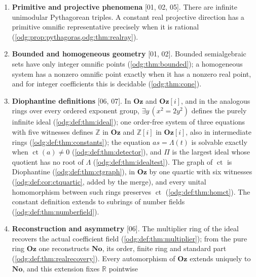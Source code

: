 \documentclass[11pt,oneside]{article}
\numberwithin{equation}{section}
\theoremstyle{definition}
\theoremstyle{remark}
\newcommand{\No}{\mathbf{No}}
\newcommand{\Oz}{\mathbf{Oz}}
\newcommand{\Z}{\mathbb Z}
\newcommand{\R}{\mathbb R}
\newcommand{\ct}{\operatorname{ct}}
\newcommand{\src}[1]{\textup{\textsf{\small[#1]}}}
\newcommand{\Og}{\Oz[i]}
\begin{document}
\begin{enumerate}[label=\textup{(\arabic*)},leftmargin=*,itemsep=3pt]
\[
 (U^2-2V^2-1)^2+
 \Bigl(U-\sum_{i=1}^{n}X_i^2-W_1^2-W_2^2-W_3^2\Bigr)^2=0
\]
with five existentially quantified auxiliary variables defines exactly
$\Z^n$ inside $\Oz^n$ (\cref{odg:thm:guard}); a variant with six auxiliary
variables and four squares defines $\Z$ (\cref{odg:thm:standarddef}), and
source 07 found the same variant independently. The graph of $\ct$ and the
ideal $\Pi$ are first-order definable (\cref{odg:cor:definablect}) and, by
item (8), Diophantine; an explicit existential induction instance fails
(\cref{odg:thm:induction}).
\item \textbf{Primitive and projective phenomena} \src{01, 02, 05}. There
are infinite unimodular Pythagorean triples. A constant real projective
direction has a primitive omnific representative precisely when it is
rational (\cref{odg:prop:pythagoras,odg:thm:realray}).
\item \textbf{Bounded and homogeneous geometry} \src{01, 02}. Bounded
semialgebraic sets have only integer omnific points
(\cref{odg:thm:bounded}); a homogeneous system has a nonzero omnific point
exactly when it has a nonzero real point, and for integer coefficients this
is decidable (\cref{odg:thm:cone}).
\item \textbf{Diophantine definitions} \src{06, 07}. In $\Oz$ and $\Og$, and in
the analogous rings over every ordered exponent group, $\exists y\,(x^2=2y^2)$
defines the purely infinite ideal (\cref{odg:def:thm:ideal}); one order-free
system of three equations with five witnesses defines $\Z$ in $\Oz$ and $\Z[i]$
in $\Og$, also in intermediate rings (\cref{odg:def:thm:constants}); the
equation $as=\Lambda(t)$ is solvable exactly when $\ct(a)\ne0$
(\cref{odg:def:thm:detector}), and $\Pi$ is the largest ideal whose quotient
has no root of $\Lambda$ (\cref{odg:def:thm:idealtest}). The graph of $\ct$ is
Diophantine (\cref{odg:def:thm:ctgraph}), in $\Oz$ by one quartic with six
witnesses (\cref{odg:def:cor:ctquartic}, added by the merge), and every unital
homomorphism between such rings preserves $\ct$ (\cref{odg:def:thm:homct}). The
constant definition extends to subrings of number fields
(\cref{odg:def:thm:numberfield}).
\item \textbf{Reconstruction and asymmetry} \src{06}. The multiplier ring of
the ideal recovers the actual coefficient field (\cref{odg:def:thm:multiplier});
from the pure ring $\Oz$ one reconstructs $\No$, its order, finite ring and
standard part (\cref{odg:def:thm:realrecovery}). Every automorphism of
$\Oz$ extends uniquely to $\No$, and this extension fixes $\R$ pointwise

\end{enumerate}
\end{document}
